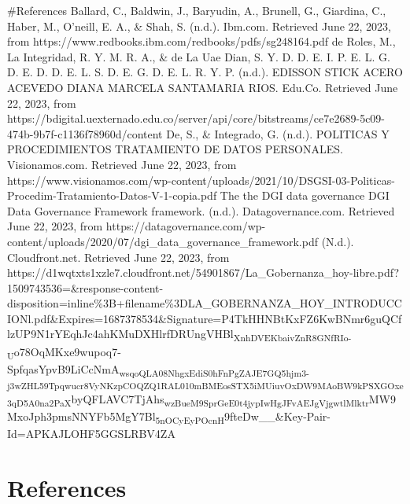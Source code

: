 \documentclass[
  letterpaper,
  DIV=11,
  numbers=noendperiod]{scrreprt}
\begin{document}
\#References Ballard, C., Baldwin, J., Baryudin, A., Brunell, G.,
Giardina, C., Haber, M., O'neill, E. A., \& Shah, S. (n.d.). Ibm.com.
Retrieved June 22, 2023, from
https://www.redbooks.ibm.com/redbooks/pdfs/sg248164.pdf de Roles, M., La
Integridad, R. Y. M. R. A., \& de La Uae Dian, S. Y. D. D. E. I. P. E.
L. G. D. E. D. D. E. L. S. D. E. G. D. E. L. R. Y. P. (n.d.). EDISSON
STICK ACERO ACEVEDO DIANA MARCELA SANTAMARIA RIOS. Edu.Co. Retrieved
June 22, 2023, from
https://bdigital.uexternado.edu.co/server/api/core/bitstreams/ce7e2689-5c09-474b-9b7f-c1136f78960d/content
De, S., \& Integrado, G. (n.d.). POLITICAS Y PROCEDIMIENTOS TRATAMIENTO
DE DATOS PERSONALES. Visionamos.com. Retrieved June 22, 2023, from
https://www.visionamos.com/wp-content/uploads/2021/10/DSGSI-03-Politicas-Procedim-Tratamiento-Datos-V-1-copia.pdf
The the DGI data governance DGI Data Governance Framework framework.
(n.d.). Datagovernance.com. Retrieved June 22, 2023, from
https://datagovernance.com/wp-content/uploads/2020/07/dgi\_data\_governance\_framework.pdf
(N.d.). Cloudfront.net. Retrieved June 22, 2023, from
https://d1wqtxts1xzle7.cloudfront.net/54901867/La\_Gobernanza\_hoy-libre.pdf?1509743536=\&response-content-disposition=inline\%3B+filename\%3DLA\_GOBERNANZA\_HOY\_INTRODUCCIONl.pdf\&Expires=1687378534\&Signature=P4TkHHNBtKxFZ6KwBNmr6guQCflzUP9N1rYEqhJc4ahKMuDXHlrfDRUngVHBl\textsubscript{XnhDVEKbaivZnR8GNfRIo-U}o78OqMKxe9wupoq7-SpfqasYpvB9LiCcNmA\textsubscript{wsqoQLA08NhgxEdiS0hFnPgZAJE7GQ5hjm3-j3wZHL59Tpqwucr8VyNKzpCOQZQ1RAL010mBMEosSTX5iMUiuvOxDW9MAoBW9kPSXGOxe3qD5A0na2PaX}byQFLAVC7TjAhs\textsubscript{wzBueM9SprGeE0t4jypIwHgJFvAEJgVjgwtlMlktr}MW9MxoJph3pmsNNYFb5MgY7Bl\textsubscript{5nOCyEyPOcnH}9fteDw\_\_\&Key-Pair-Id=APKAJLOHF5GGSLRBV4ZA


\hypertarget{references-1}{%
\chapter*{References}\label{references-1}}

\end{document}
